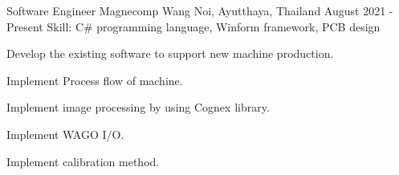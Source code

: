 
\begin{cventries}

  \cventry
    {Software Engineer} %
    {Magnecomp} %
    {Wang Noi, Ayutthaya, Thailand} %
    {August 2021 - Present} %
    {Skill: C\# programming language, Winform framework, PCB design} %
    {
      \begin{cvitems} %
      \item {Develop the existing software to support new machine production.}
        \item {Implement Process flow of machine.}
        \item {Implement image processing by using Cognex library.}
        \item {Implement WAGO I/O.}
        \item {Implement calibration method.}
      \end{cvitems}
    }


\end{cventries}
